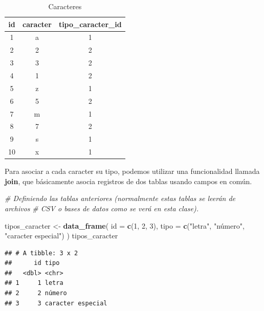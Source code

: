 \documentclass[]{book}
\newenvironment{Shaded}{\begin{snugshade}}{\end{snugshade}}
\newcommand{\KeywordTok}[1]{\textcolor[rgb]{0.13,0.29,0.53}{\textbf{#1}}}
\newcommand{\DataTypeTok}[1]{\textcolor[rgb]{0.13,0.29,0.53}{#1}}
\newcommand{\DecValTok}[1]{\textcolor[rgb]{0.00,0.00,0.81}{#1}}
\newcommand{\StringTok}[1]{\textcolor[rgb]{0.31,0.60,0.02}{#1}}
\newcommand{\CommentTok}[1]{\textcolor[rgb]{0.56,0.35,0.01}{\textit{#1}}}
\newcommand{\NormalTok}[1]{#1}
\theoremstyle{definition}
\theoremstyle{definition}
\theoremstyle{definition}
\theoremstyle{remark}
\begin{document}
\begin{table}

\caption{\label{tab:unnamed-chunk-29}Caracteres}
\centering
\begin{tabular}[t]{c|c|c}
\hline
id & caracter & tipo\_caracter\_id\\
\hline
1 & a & 1\\
\hline
2 & 2 & 2\\
\hline
3 & 3 & 2\\
\hline
4 & 1 & 2\\
\hline
5 & z & 1\\
\hline
6 & 5 & 2\\
\hline
7 & m & 1\\
\hline
8 & 7 & 2\\
\hline
9 & s & 1\\
\hline
10 & x & 1\\
\hline
\end{tabular}
\end{table}

Para asociar a cada caracter su tipo, podemos utilizar una funcionalidad
llamada \textbf{join}, que básicamente asocia registros de dos tablas
usando campos en común.

\begin{Shaded}
\begin{Highlighting}[]
\CommentTok{# Definiendo las tablas anteriores (normalmente estas tablas se leerán de archivos}
\CommentTok{# CSV o bases de datos como se verá en esta clase).}

\NormalTok{tipos_caracter <-}\StringTok{ }\KeywordTok{data_frame}\NormalTok{(}
  \DataTypeTok{id =} \KeywordTok{c}\NormalTok{(}\DecValTok{1}\NormalTok{, }\DecValTok{2}\NormalTok{, }\DecValTok{3}\NormalTok{),}
  \DataTypeTok{tipo =} \KeywordTok{c}\NormalTok{(}\StringTok{"letra"}\NormalTok{, }\StringTok{"número", "}\NormalTok{caracter especial}\StringTok{")}
\StringTok{)}
\StringTok{tipos_caracter}
\end{Highlighting}
\end{Shaded}

\begin{verbatim}
## # A tibble: 3 x 2
##      id tipo             
##   <dbl> <chr>            
## 1     1 letra            
## 2     2 número           
## 3     3 caracter especial
\end{verbatim}
\end{document}
